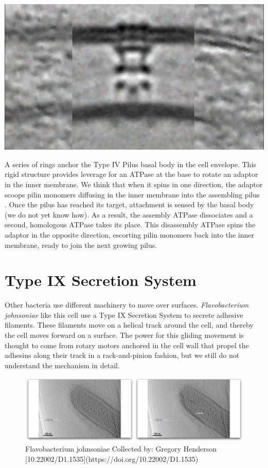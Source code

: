 \documentclass[]{tufte-book}
\begin{document}
\includegraphics{img/schematics/6_10_1}

A series of rings anchor the Type IV Pilus basal body in the cell
envelope. This rigid structure provides leverage for an ATPase at the
base to rotate an adaptor in the inner membrane. We think that when it
spins in one direction, the adaptor scoops pilin monomers diffusing in
the inner membrane into the assembling pilus \citet{chang2016}. Once the
pilus has reached its target, attachment is sensed by the basal body (we
do not yet know how). As a result, the assembly ATPase dissociates and a
second, homologous ATPase takes its place. This disassembly ATPase spins
the adaptor in the opposite direction, escorting pilin monomers back
into the inner membrane, ready to join the next growing pilus.

\section{Type IX Secretion System}\label{type-ix-secretion-system}

Other bacteria use different machinery to move over surfaces.
\emph{Flavobacterium johnsoniae} like this cell use a Type IX Secretion
System to secrete adhesive filaments. These filaments move on a helical
track around the cell, and thereby the cell moves forward on a surface.
The power for this gliding movement is thought to come from rotary
motors anchored in the cell wall that propel the adhesins along their
track in a rack-and-pinion fashion, but we still do not understand the
mechanism in detail.

\begin{figure}
\includegraphics{movie_stills/6_11} \caption[Flavobacterium johnsoniae Collected by]{Flavobacterium johnsoniae Collected by: Gregory Henderson [10.22002/D1.1535](https://doi.org/10.22002/D1.1535)}\label{fig:unnamed-chunk-120}
\end{figure}
\end{document}
